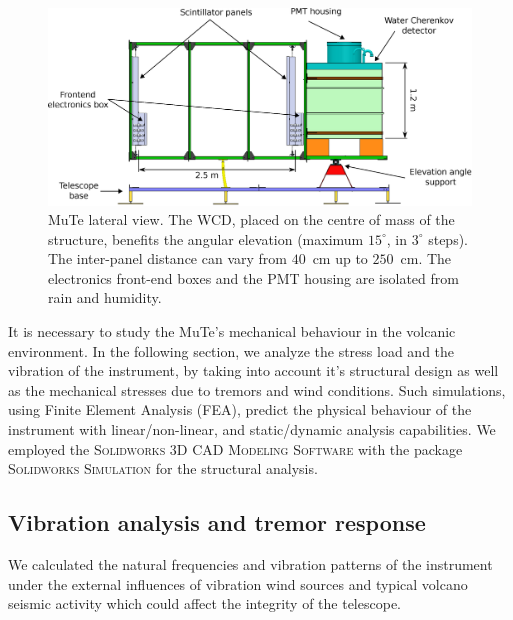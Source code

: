 \documentclass[letterpaper,11pt]{article}
\begin{document}

\begin{figure}[htb]
\centering
\includegraphics[width=1\columnwidth]{Figures/Detector.eps}
\caption{MuTe lateral view. The WCD, placed on the centre of mass of the structure, benefits the angular elevation (maximum $15^{\circ}$, in $3^{\circ}$ steps). The inter-panel distance can vary from  $40$~cm up to $250$~cm. The electronics front-end boxes and the PMT housing are isolated from rain and humidity.}
  \label{fig:Structure}
\end{figure}

 It is necessary to study the MuTe's mechanical behaviour in the volcanic environment. In the following section, we analyze the stress load and the vibration of the instrument, by taking into account it's structural design as well as the mechanical stresses due to tremors and wind conditions. Such simulations, using Finite Element Analysis (FEA), predict the physical behaviour of the instrument with linear/non-linear, and static/dynamic analysis capabilities. We employed the \textsc{Solidworks 3D CAD Modeling Software} with the package \textsc{Solidworks Simulation} for the structural analysis. 


\subsection{Vibration analysis and tremor response}
We calculated the natural frequencies and vibration patterns of the instrument under the external influences of vibration wind sources and typical volcano seismic activity which could affect the integrity of the telescope. 
\end{document}
